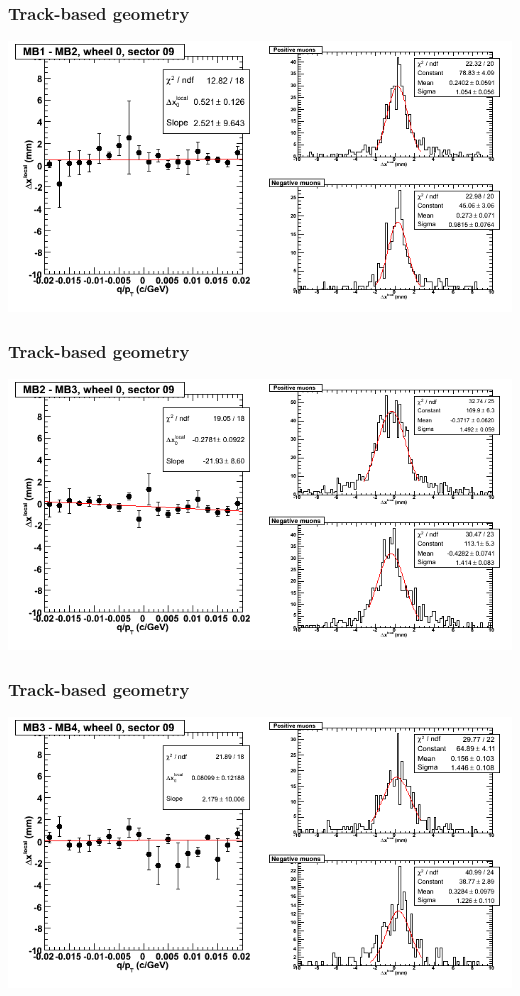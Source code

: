 \documentclass[compress]{beamer}
\begin{document}
\begin{frame}
\frametitle{Track-based geometry}
\includegraphics[width=\linewidth]{NOV4_segdiffs/dt13_resid_C_09_12.png}
\end{frame}

\begin{frame}
\frametitle{Track-based geometry}
\includegraphics[width=\linewidth]{NOV4_segdiffs/dt13_resid_C_09_23.png}
\end{frame}

\begin{frame}
\frametitle{Track-based geometry}
\includegraphics[width=\linewidth]{NOV4_segdiffs/dt13_resid_C_09_34.png}
\end{frame}
\end{document}
